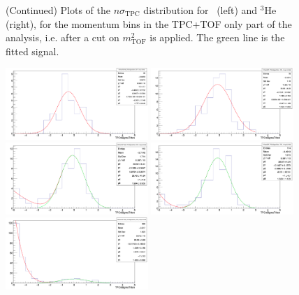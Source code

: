 \begin{figure}
    \caption{(Continued) Plots of the $n\sigma_{\mathrm{TPC}}$ distribution for \ahe\ (left) and $^3\mathrm{He}$ (right), for the momentum bins in the TPC+TOF only part of the analysis, i.e. after a cut on $m_{\mathrm{TOF}}^2$ is applied. The green line is the fitted signal.}
    \label{fig:he3_TOF_PID}
\end{figure}


\begin{figure}
    \centering
    \includegraphics[width=0.48\textwidth]{figures/triton/ATriton_TPCnSigma_Bin2.png}
    \includegraphics[width=0.48\textwidth]{figures/triton/Triton_TPCnSigma_Bin2.png}
    \includegraphics[width=0.48\textwidth]{figures/triton/ATriton_TPCnSigma_Bin3.png}
    \includegraphics[width=0.48\textwidth]{figures/triton/Triton_TPCnSigma_Bin3.png}
    \includegraphics[width=0.48\textwidth]{figures/triton/ATriton_TPCnSigma_Bin4.png}

\end{figure}

